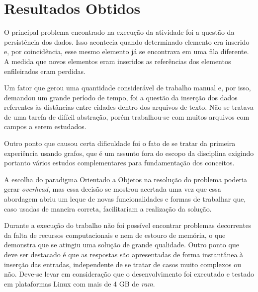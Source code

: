 \chapter*[Resultados Obtidos]{Resultados Obtidos}

O principal problema encontrado na execução da atividade foi a questão da persistência dos 
dados. Isso acontecia quando determinado elemento era inserido e, por coincidência, esse mesmo 
elemento já se encontrava em uma fila diferente. A medida que novos elementos eram inseridos as referências dos elementos enfileirados eram perdidas.

Um fator que gerou uma quantidade considerável de trabalho manual e, por isso, demandou um grande período de tempo, foi a questão da inserção dos dados referentes às distâncias entre cidades dentro dos arquivos de 
texto. Não se tratava de uma tarefa de difícil abstração, porém trabalhou-se com muitos arquivos com campos 
a serem estudados. 

Outro ponto que causou certa dificuldade foi o fato de se tratar da primeira experiência usando grafos,
que é um assunto fora do escopo da disciplina exigindo portanto vários estudos complementares para 
fundamentação dos conceitos. 

A escolha do paradigma Orientado a Objetos na resolução do problema poderia gerar \textit{overhead}, mas essa decisão se mostrou acertada uma vez que essa abordagem abriu um leque de novas funcionalidades e 
formas de trabalhar que, caso usadas de maneira correta, facilitariam a realização da solução.

Durante a execução do trabalho não foi possível encontrar problemas decorrentes da falta de recursos 
computacionais e nem de estouro de memória, o que demonstra que se atingiu uma solução de 
grande qualidade. Outro ponto que deve ser destacado é que as respostas são apresentadas de forma instantânea à inserção das entradas, independente de se tratar de casos muito complexos ou não. Deve-se levar em consideração que o desenvolvimento foi executado e testado em plataformas Linux com mais de 4 GB de \textit{ram}.